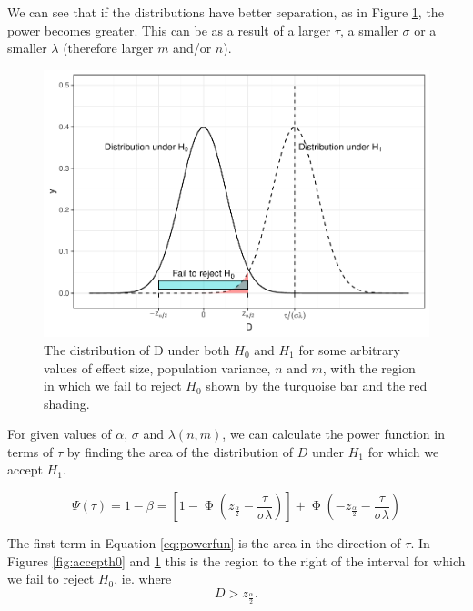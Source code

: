 \documentclass[
  openany]{book}
\theoremstyle{definition}
\theoremstyle{definition}
\theoremstyle{definition}
\theoremstyle{definition}
\theoremstyle{remark}
\begin{document}
We can see that if the distributions have better separation, as in Figure \ref{fig:accepth0-1}, the power becomes greater. This can be as a result of a larger \(\tau\), a smaller \(\sigma\) or a smaller \(\lambda\) (therefore larger \(m\) and/or \(n\)).

\begin{figure}
\centering
\includegraphics{CT4H_notes_files/figure-latex/accepth0-1-1.pdf}
\caption{\label{fig:accepth0-1}The distribution of D under both \(H_0\) and \(H_1\) for some arbitrary values of effect size, population variance, \(n\) and \(m\), with the region in which we fail to reject \(H_0\) shown by the turquoise bar and the red shading.}
\end{figure}

For given values of \(\alpha\), \(\sigma\) and \(\lambda\left(n,m\right)\), we can calculate the power function in terms of \(\tau\) by finding the area of the distribution of \(D\) under \(H_1\) for which we accept \(H_1\).

\begin{equation}
\Psi\left(\tau\right) = 1-\beta = \left[1 - \operatorname{\Phi}\left(z_{\frac{\alpha}{2}} - \frac{\tau}{\sigma\lambda}\right)\right] + \operatorname{\Phi}\left(-z_{\frac{\alpha}{2}} - \frac{\tau}{\sigma\lambda}\right)
\label{eq:powerfun}
\end{equation}

The first term in Equation \eqref{eq:powerfun} is the area in the direction of \(\tau\). In Figures \ref{fig:accepth0} and \ref{fig:accepth0-1} this is the region to the right of the interval for which we fail to reject \(H_0\), ie. where \[D > z_{\frac{\alpha}{2}}.\]
\end{document}

